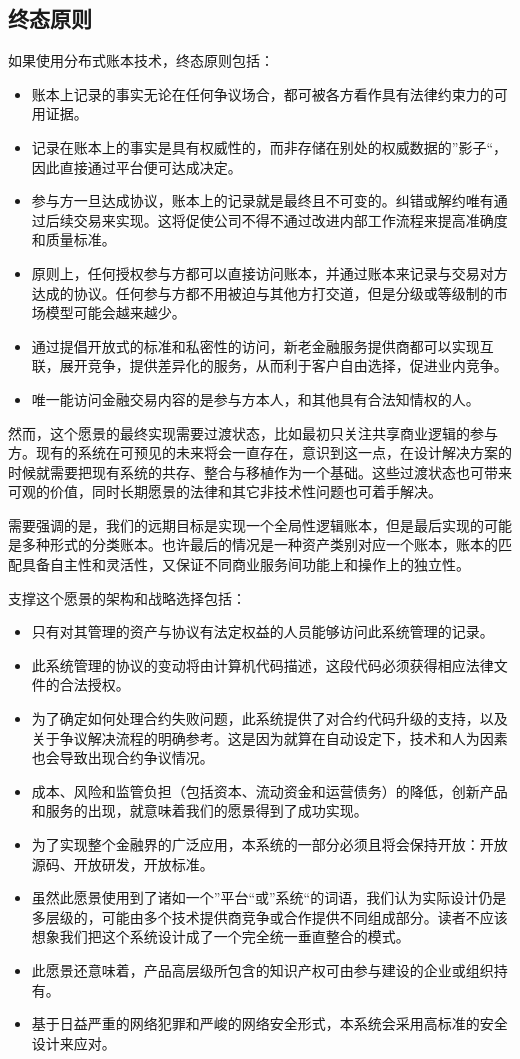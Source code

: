 \documentclass[UTF8]{ctexart}
\begin{document}
\subsection{终态原则}
如果使用分布式账本技术，终态原则包括：
\begin{itemize}
	\item 账本上记录的事实无论在任何争议场合，都可被各方看作具有法律约束力的可用证据。
	\item 记录在账本上的事实是具有权威性的，而非存储在别处的权威数据的”影子“，因此直接通过平台便可达成决定。
	\item 参与方一旦达成协议，账本上的记录就是最终且不可变的。纠错或解约唯有通过后续交易来实现。这将促使公司不得不通过改进内部工作流程来提高准确度和质量标准。
	\item 原则上，任何授权参与方都可以直接访问账本，并通过账本来记录与交易对方达成的协议。任何参与方都不用被迫与其他方打交道，但是分级或等级制的市场模型可能会越来越少。 
	\item 通过提倡开放式的标准和私密性的访问，新老金融服务提供商都可以实现互联，展开竞争，提供差异化的服务，从而利于客户自由选择，促进业内竞争。
	\item 唯一能访问金融交易内容的是参与方本人，和其他具有合法知情权的人。
\end{itemize}

然而，这个愿景的最终实现需要过渡状态，比如最初只关注共享商业逻辑的参与方。现有的系统在可预见的未来将会一直存在，意识到这一点，在设计解决方案的时候就需要把现有系统的共存、整合与移植作为一个基础。这些过渡状态也可带来可观的价值，同时长期愿景的法律和其它非技术性问题也可着手解决。

需要强调的是，我们的远期目标是实现一个全局性逻辑账本，但是最后实现的可能是多种形式的分类账本。也许最后的情况是一种资产类别对应一个账本，账本的匹配具备自主性和灵活性，又保证不同商业服务间功能上和操作上的独立性。 

支撑这个愿景的架构和战略选择包括：
\begin{itemize} 
\item 只有对其管理的资产与协议有法定权益的人员能够访问此系统管理的记录。
\item 此系统管理的协议的变动将由计算机代码描述，这段代码必须获得相应法律文件的合法授权。\cite{Ricardian}
\item 为了确定如何处理合约失败问题，此系统提供了对合约代码升级的支持，以及关于争议解决流程的明确参考。这是因为就算在自动设定下，技术和人为因素也会导致出现合约争议情况。 
\item 成本、风险和监管负担（包括资本、流动资金和运营债务）的降低，创新产品和服务的出现，就意味着我们的愿景得到了成功实现。
\item 为了实现整个金融界的广泛应用，本系统的一部分必须且将会保持开放：开放源码、开放研发，开放标准。
\item 虽然此愿景使用到了诸如一个”平台“或”系统“的词语，我们认为实际设计仍是多层级的，可能由多个技术提供商竞争或合作提供不同组成部分。读者不应该想象我们把这个系统设计成了一个完全统一垂直整合的模式。
\item 此愿景还意味着，产品高层级所包含的知识产权可由参与建设的企业或组织持有。
\item 基于日益严重的网络犯罪和严峻的网络安全形式，本系统会采用高标准的安全设计来应对。
\end{itemize}
\end{document}
